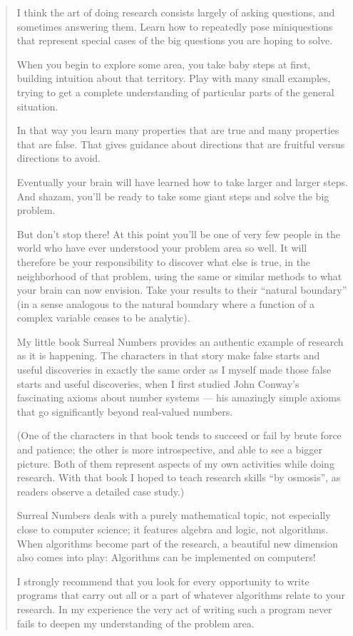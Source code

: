 \begin{framed}
\begin{quotation}                                                                                                               I think the art of doing research consists largely of asking questions,
and sometimes answering them. Learn how to repeatedly pose miniquestions
that represent special cases of the big questions you are hoping to solve.

When you begin to explore some area, you take baby steps at first, building
intuition about that territory. Play with many small examples, trying to
get a complete understanding of particular parts of the general situation.

In that way you learn many properties that are true and many properties
that are false. That gives guidance about directions that are fruitful
versus directions to avoid.

Eventually your brain will have learned how to take larger and larger steps.
And shazam, you’ll be ready to take some giant steps and solve the big problem.

But don’t stop there! At this point you’ll be one of very few people in the
world who have ever understood your problem area so well. It will therefore
be your responsibility to discover what else is true, in the neighborhood
of that problem, using the same or similar methods to what your brain
can now envision. Take your results to their “natural boundary” (in a sense
analogous to the natural boundary where a function of a complex variable
ceases to be analytic).

My little book Surreal Numbers provides an authentic example of research
as it is happening. The characters in that story make false starts and
useful discoveries in exactly the same order as I myself made those false starts
and useful discoveries, when I first studied John Conway’s fascinating
axioms about number systems — his amazingly simple axioms that go
significantly beyond real-valued numbers.

(One of the characters in that book tends to succeed or fail by brute force
and patience; the other is more introspective, and able to see a bigger
picture. Both of them represent aspects of my own activities while doing
research. With that book I hoped to teach research skills “by osmosis”,
as readers observe a detailed case study.)

Surreal Numbers deals with a purely mathematical topic, not especially close
to computer science; it features algebra and logic, not algorithms.
When algorithms become part of the research, a beautiful new dimension
also comes into play: Algorithms can be implemented on computers!

I strongly recommend that you look for every opportunity to write programs
that carry out all or a part of whatever algorithms relate to your research.
In my experience the very act of writing such a program never fails to
deepen my understanding of the problem area.
\end{quotation}
\end{framed}
